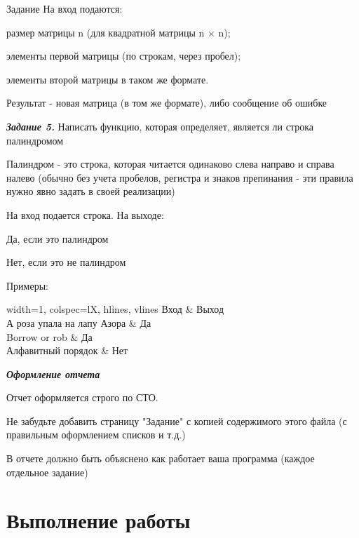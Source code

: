 \documentclass{vvsu}
\begin{document}
\begin{addition}{Задание}
  На вход подаются:
  \begin{vvsu_list}
    \item размер матрицы n (для квадратной матрицы n × n);
    \item элементы первой матрицы (по строкам, через пробел);
    \item элементы второй матрицы в таком же формате.
  \end{vvsu_list}

  Результат - новая матрица (в том же формате), либо сообщение об ошибке

  \textit{\textbf{Задание 5.}}  
  Написать функцию, которая определяет, является ли строка палиндромом

  Палиндром - это строка, которая читается одинаково слева направо и справа налево (обычно без учета пробелов, регистра и знаков препинания - эти правила нужно явно задать в своей реализации)

На вход подается строка. На выходе:
   \begin{vvsu_itemize}
    \item Да, если это палиндром
    \item Нет, если это не палиндром
    \end{vvsu_itemize}

Примеры:
    \begin{vvsu_table}{}
  \label{table:space_terms}
  \begin{tblr}{
    width=1\linewidth,
    colspec={lX},
    hlines, vlines
  }
  Вход	   & Выход \\
  А роза упала на лапу Азора	 & Да \\
  Borrow or rob & Да \\ 
  Алфавитный порядок   & Нет \\
  \end{tblr}
  \end{vvsu_table}

\textit{\textbf{Оформление отчета}}  

Отчет оформляется строго по СТО.

Не забудьте добавить страницу "Задание" с копией содержимого этого файла (с правильным оформлением списков и т.д.)

В отчете должно быть объяснено как работает ваша программа (каждое отдельное задание)

\end{addition}

\toc

\section{Выполнение работы}
\label{sec:execution}
\end{document}
